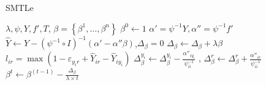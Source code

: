 \begin{algorithm}\label{alg:1}
       \caption{SMTLe}\label{alg:1}
        \begin{algorithmic}[1]
            \REQUIRE $\lambda, \psi,Y,f',T$,
            \ENSURE $\beta=\left\{\beta^1,...,\beta^n\right\}$
            \STATE $\beta^0 \leftarrow 1$
            \STATE $\alpha' = \psi^{-1}Y,\alpha'' = \psi^{-1}f'$
                \STATE $\hat Y \leftarrow Y - {\left( {\psi^{-1} \circ I} \right)^{ - 1}}\left( \alpha' - \alpha''\beta \right)$,${\Delta _\beta }=0$ 
                	\STATE ${\Delta _\beta }\leftarrow {\Delta _\beta }+\lambda\beta$ 
	                    \STATE $l_{ir} = \max(1 - {\varepsilon _{{y_i}r}} + {\hat Y_{ir}} - {\hat Y_{i{y_i}}})$
	                            \STATE $\Delta _\beta^{{y_i}} \leftarrow \Delta _\beta^{{y_i}} - \frac{{{\alpha''_{i{y_i}}}}}{{{\psi^{-1}_{ii}}}}$%
	                            , $\Delta _\beta^{{r}} \leftarrow \Delta _\beta^{{r}} + \frac{{{\alpha''_{i{r}}}}}{{{\psi^{-1}_{ii}}}}$%
	                    \ENDIF
                \ENDFOR %
                \STATE $\beta^t  \leftarrow \beta^{(t-1)}  - \frac{{{\Delta _\beta }}}{{\lambda\times {t} }}$
             \ENDFOR %
        \end{algorithmic}
\end{algorithm}